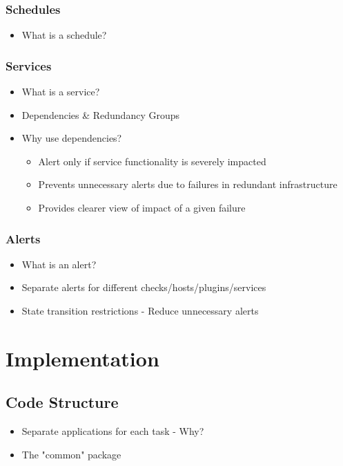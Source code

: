 \documentclass[bsc,logo,twoside]{infthesis}
\begin{document}
\subsection{Schedules}
\begin{itemize}
	\item What is a schedule?
\end{itemize}

\subsection{Services}
\begin{itemize}
	\item What is a service?
	\item Dependencies \& Redundancy Groups
	\item Why use dependencies?
	\begin{itemize}
		\item Alert only if service functionality is severely impacted
		\item Prevents unnecessary alerts due to failures in redundant infrastructure
		\item Provides clearer view of impact of a given failure
	\end{itemize}
\end{itemize}

\subsection{Alerts}
\begin{itemize}
	\item What is an alert?
	\item Separate alerts for different checks/hosts/plugins/services
	\item State transition restrictions - Reduce unnecessary alerts
\end{itemize}

\chapter{Implementation}
\section{Code Structure}
\begin{itemize}
	\item Separate applications for each task - Why?
	\item The "common" package
\end{itemize}
\end{document}
